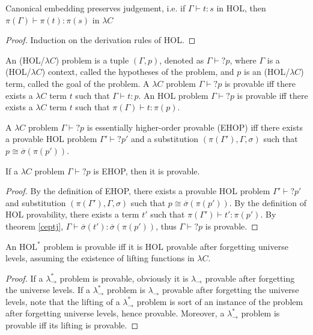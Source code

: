\begin{theorem}\label{ceptj} Canonical embedding preserves judgement, i.e. if $\Gamma \vdash t : s$ in HOL, then
  $\pi(\Gamma) \vdash \pi(t) : \pi(s)$ in $\lambda C$ \end{theorem}
\begin{proof} Induction on the derivation rules of HOL. \end{proof}

\begin{definition} An (HOL/$\lambda C$) problem is a tuple $(\Gamma, p)$, denoted
  as $\Gamma \vdash? p$, where $\Gamma$ is a (HOL/$\lambda C$)
  context, called the hypotheses of the problem, and $p$ is an
  (HOL/$\lambda C$) term, called the goal of the problem. A $\lambda C$ problem
  $\Gamma \vdash? p$ is provable iff there exists a $\lambda C$ term $t$ such that
  $\Gamma \vdash t : p$. An HOL problem $\Gamma \vdash? p$ is provable iff there exists
  a $\lambda C$ term $t$ such that $\pi(\Gamma) \vdash t : \pi(p)$.
\end{definition}

\begin{definition} A $\lambda C$ problem $\Gamma \vdash? p$ is essentially higher-order provable (EHOP)
  iff there exists a provable HOL problem $\Gamma' \vdash? p'$ and a substitution
  $(\pi(\Gamma'), \Gamma, \sigma)$ such that $p \cong \overline{\sigma}(\pi(p'))$.
\end{definition}

\begin{theorem}
  If a $\lambda C$ problem $\Gamma \vdash? p$ is EHOP, then it is provable.
\end{theorem}
\begin{proof} By the definition of EHOP, there exists a provable HOL problem
  $\Gamma' \vdash? p'$ and substitution $(\pi(\Gamma'), \Gamma, \sigma)$ such that
  $p \cong \overline{\sigma}(\pi(p'))$. By the definition of HOL provability, there exists
  a term $t'$ such that $\pi(\Gamma') \vdash t' : \pi(p')$. By theorem \ref{ceptj},
  $\Gamma \vdash \overline{\sigma}(t') : \overline{\sigma}(\pi(p'))$, thus $\Gamma \vdash? p$
  is provable.
\end{proof}


\begin{theorem} An $\text{HOL}^*$ problem is provable iff it is HOL provable after forgetting
  universe levels, assuming the existence of lifting functions in $\lambda C$.
\end{theorem}
\begin{proof}
  If a $\lambda_\to^*$ problem is provable, obviously it is $\lambda_\to$ provable
  after forgetting the universe levels. If a $\lambda_\to^*$ problem is $\lambda_\to$ provable
  after forgetting the universe levels, note that the lifting of a $\lambda_\to^*$ problem is sort of
  an instance of the problem after forgetting universe levels, hence provable. Moreover,
  a $\lambda_\to^*$ problem is provable iff its lifting is provable.  
\end{proof}

